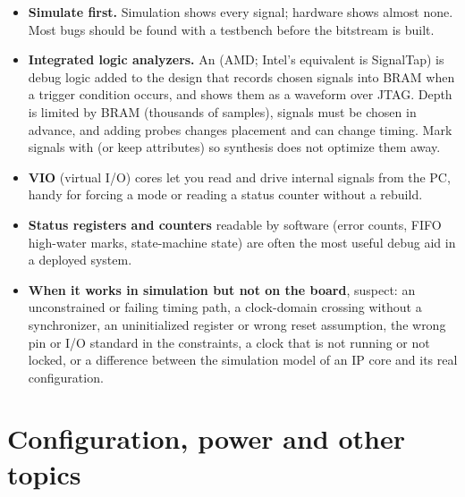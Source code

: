 \begin{itemize}
  \item \textbf{Simulate first.} Simulation shows every signal; hardware shows almost none. Most bugs should be found with a testbench before the bitstream is built.
  \item \textbf{Integrated logic analyzers.} An  (AMD; Intel's equivalent is SignalTap) is debug logic added to the design that records chosen signals into BRAM when a trigger condition occurs, and shows them as a waveform over JTAG. Depth is limited by BRAM (thousands of samples), signals must be chosen in advance, and adding probes changes placement and can change timing. Mark signals with  (or keep attributes) so synthesis does not optimize them away.
  \item \textbf{VIO} (virtual I/O) cores let you read and drive internal signals from the PC, handy for forcing a mode or reading a status counter without a rebuild.
  \item \textbf{Status registers and counters} readable by software (error counts, FIFO high-water marks, state-machine state) are often the most useful debug aid in a deployed system.
  \item \textbf{When it works in simulation but not on the board}, suspect: an unconstrained or failing timing path, a clock-domain crossing without a synchronizer, an uninitialized register or wrong reset assumption, the wrong pin or I/O standard in the constraints, a clock that is not running or not locked, or a difference between the simulation model of an IP core and its real configuration.
\end{itemize}

\section{Configuration, power and other topics}

